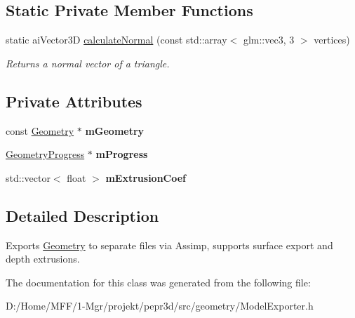 \subsection*{Static Private Member Functions}
\begin{DoxyCompactItemize}
\item 
\mbox{\label{classpepr3d_1_1_model_exporter_a0ac9e0564adb8d2a8d3283b19aa033de}} 
static ai\+Vector3D \mbox{\hyperlink{classpepr3d_1_1_model_exporter_a0ac9e0564adb8d2a8d3283b19aa033de}{calculate\+Normal}} (const std\+::array$<$ glm\+::vec3, 3 $>$ vertices)
\begin{DoxyCompactList}\small\item\em Returns a normal vector of a triangle. \end{DoxyCompactList}\end{DoxyCompactItemize}
\subsection*{Private Attributes}
\begin{DoxyCompactItemize}
\item 
\mbox{\label{classpepr3d_1_1_model_exporter_a76a48fd072cfd132b2d9130d915d5fc7}} 
const \mbox{\hyperlink{classpepr3d_1_1_geometry}{Geometry}} $\ast$ {\bfseries m\+Geometry}
\item 
\mbox{\label{classpepr3d_1_1_model_exporter_a618a0accacf4026df647364d4843049f}} 
\mbox{\hyperlink{structpepr3d_1_1_geometry_progress}{Geometry\+Progress}} $\ast$ {\bfseries m\+Progress}
\item 
\mbox{\label{classpepr3d_1_1_model_exporter_a795c2ac3c88bd58f8d3972b7e5a17dc5}} 
std\+::vector$<$ float $>$ {\bfseries m\+Extrusion\+Coef}
\end{DoxyCompactItemize}


\subsection{Detailed Description}
Exports \mbox{\hyperlink{classpepr3d_1_1_geometry}{Geometry}} to separate files via Assimp, supports surface export and depth extrusions. 

The documentation for this class was generated from the following file\+:\begin{DoxyCompactItemize}
\item 
D\+:/\+Home/\+M\+F\+F/1-\/\+Mgr/projekt/pepr3d/src/geometry/Model\+Exporter.\+h\end{DoxyCompactItemize}
